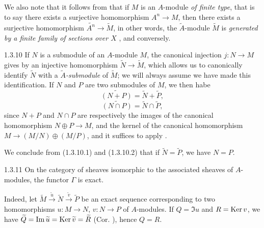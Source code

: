 We also note that it follows from  that if $M$ is an $A$-module \emph{of
finite type}, that is to say there exists a surjective homomorphism $A^n\to M$, then there
exists a surjective homomorphism $\widetilde{A^n}\to\widetilde{M}$, in other words, the
$\widetilde{A}$-module $\widetilde{M}$ is \emph{generated by a finite family of sections over
$X$} , and conversely.

\begin{env}{1.3.10}
\label{env-1.1.3.10}
If $N$ is a submodule of an $A$-module $M$, the canonical injection $j:N\to M$ gives by
 an injective homomorphism $\widetilde{N}\to\widetilde{M}$, which allows us
to canonically identify $\widetilde{N}$ with a \emph{$\widetilde{A}$-submodule} of
$\widetilde{M}$; we will always assume we have made this identification. If $N$ and $P$ are
two submodules of $M$, we then habe
\[
  \widetilde{(N+P)}=\widetilde{N}+\widetilde{P},
  \tag{1.3.10.1}
\]
\[
  \widetilde{(N\cap P)}=\widetilde{N}\cap\widetilde{P},
  \tag{1.3.10.2}
\]
since $N+P$ and $N\cap P$ are respectively the images of the canonical homomorphism
$N\oplus P\to M$, and the kernel of the canonical homomorphism $M\to(M/N)\oplus(M/P)$, and
it suffices to apply .

We conclude from (1.3.10.1) and (1.3.10.2) that if $\widetilde{N}=\widetilde{P}$, we have
$N=P$.
\end{env}

\begin{envs}[Corollary]{1.3.11}
\label{cor-1.1.3.11}
On the category of sheaves isomorphic to the associated sheaves of $A$-modules, the functor
$\Gamma$ is exact.
\end{envs}

Indeed, let
$\widetilde{M}\xrightarrow{\widetilde{u}}\widetilde{N}
\xrightarrow{\widetilde{v}}\widetilde{P}$ be an exact sequence corresponding to two
homomorphisms $u:M\to N$, $v:N\to P$ of $A$-modules. If $Q=\Im u$ and $R={\mathop{\mathrm{Ker}}\nolimits}\, v$, we have
$\widetilde{Q}={\mathop{\mathrm{Im}}\nolimits}\,\widetilde{u}={\mathop{\mathrm{Ker}}\nolimits}\,\widetilde{v}=\widetilde{R}$ (Cor. ),
hence $Q=R$.

